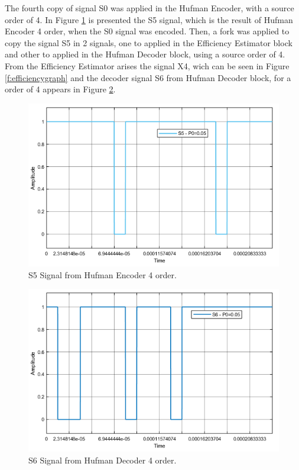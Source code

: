 \begin{refsection}
The fourth copy of signal S0 was applied in the Hufman Encoder, with a source order of 4. In Figure \ref{f:S5} is presented the S5 signal, which is the result of Hufman Encoder 4 order, when the S0 signal was encoded.
Then, a fork was applied to copy the signal S5 in 2 signals, one to applied in the Efficiency Estimator block and other to applied in the Hufman Decoder block, using a source order of 4.
From the Efficiency Estimator arises the signal X4, wich can be seen in Figure \ref{f:efficiencygraph} and the decoder signal S6 from Hufman Decoder block, for a order of 4 appears in Figure \ref{f:S6}. 


\begin{figure}[!h]
\centering
\includegraphics[width=5in]{./sdf/eit_45550_estimator_source_code_efficiency/figures/S5.png}
\caption[S5 Signal from Hufman Encoder 4 order.]{S5 Signal from Hufman Encoder 4 order.}
\label{f:S5}
\end{figure}


\begin{figure}[!h]
\centering
\includegraphics[width=5in]{./sdf/eit_45550_estimator_source_code_efficiency/figures/S6.png}
\caption[S6 Signal from Hufman Decoder 4 order.]{S6 Signal from Hufman Decoder 4 order.}
\label{f:S6}
\end{figure}


\end{refsection}
